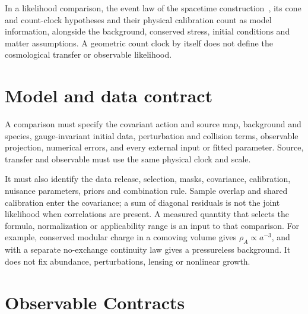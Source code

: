 \documentclass[11pt]{article}
\begin{document}
In a likelihood comparison, the event law of the spacetime
construction~\cite{ophEinstein}, its cone and count-clock hypotheses and
their physical calibration count as model information, alongside the
background, conserved stress, initial conditions and matter assumptions. A
geometric count clock by itself does not define the cosmological transfer or
observable likelihood.

\section{Model and data contract}
A comparison must specify the covariant action and source map, background
and species, gauge-invariant initial data, perturbation and collision
terms, observable projection, numerical errors, and every external input
or fitted parameter. Source, transfer and observable must use the same
physical clock and scale.

It must also identify the data release, selection, masks, covariance,
calibration, nuisance parameters, priors and combination rule. Sample
overlap and shared calibration enter the covariance; a sum of diagonal
residuals is not the joint likelihood when correlations are present.
A measured quantity that selects the formula, normalization or applicability
range is an input to that comparison. For example, conserved modular
charge in a comoving volume gives \(\rho_A\propto a^{-3}\), and with a
separate no-exchange continuity law gives a pressureless background. It
does not fix abundance, perturbations, lensing or nonlinear growth.

\section{Observable Contracts}
\end{document}
